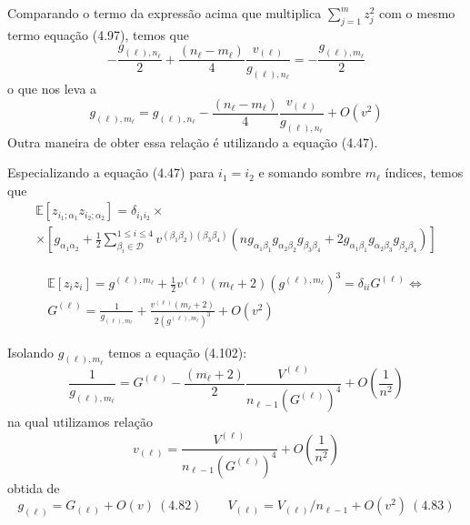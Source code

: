 \documentclass{beamer}
\newcommand{\EE}{\mathbb{E}}
\newcommand{\Dcal}{\mathcal{D}}
\def\mi#1{{\alpha_{#1}}}
\def\mj#1{\beta_{#1}}
\def\eell{{(\ell)}}
\newcommand{\zia}[2]{z_{i_{#1};\mi{#2}}}
\begin{document}
\begin{frame}
	Comparando o termo da expressão acima que multiplica $\sum_{j=1}^{m}z_j^2$ com o mesmo termo equação (4.97), temos que 
	\[
	-\frac{g_{\eell,n_\ell}}{2} + \frac{(n_\ell-m_\ell)}{4}\frac{v_\eell}{g_{\eell,n_\ell}} = -\frac{g_{\eell,m_\ell}}{2}
	\]
	o que nos leva a
	\begin{equation*}\tag{4.100}
		g_{\eell,m_\ell} = g_{\eell,n_\ell} - \frac{(n_\ell -m_\ell)}{4}\frac{v_{\eell}}{g_{\eell,n_\ell}} + O(v^2)
	\end{equation*}  
	Outra maneira de obter essa relação é utilizando a equação (4.47).
\end{frame}


\begin{frame}
	Especializando a equação (4.47) para $i_1=i_2$ e somando sombre $m_\ell$ índices, temos que
	\footnotesize
	\begin{multline*}\tag{4.47}
		\EE[\zia11\zia22] = \delta_{i_1 i_2}\times\\\times\left[g_{\mi1\mi2} + \frac{1}{2} \sum_{\mj{i}\in\Dcal}^{1\le{i}\le4} v^{(\mj1\mj2)(\mj3\mj4)}(ng_{\mi1\mj1}g_{\mi2\mj2}g_{\mj3\mj4} +2g_{\mi1\mj1}g_{\mi2\mj3}g_{\mj2\mj4})\right] 
	\end{multline*}
	 
	\begin{multline*}\tag{4.101}
		\EE[z_i z_i] = g^{\eell,m_\ell} + \frac{1}{2} v^\eell(m_\ell+2)(g^{\eell,m_\ell})^3  = \delta_{ii}G^\eell \Leftrightarrow\\%
		G^\eell = \frac{1}{g_{\eell,m_\ell}} + \frac{ v^\eell(m_\ell+2)}{2(g^{\eell,m_\ell})^3} + O\left(v^2\right)
	\end{multline*}
\end{frame}

\begin{frame}
	Isolando $g_{\eell,m_\ell}$ temos a equação (4.102):
	\begin{equation*}\tag{4.102}
		\frac{1}{g_{\eell,m_\ell}} = G^\eell - \frac{(m_\ell+2)}{2}\frac{V^\eell}{n_{\ell-1}(G^\eell)^4} + O\left(\frac{1}{n^2}\right)
	\end{equation*}
	na qual utilizamos relação
	\begin{equation*}\tag{4.103}
		v_\eell = \frac{V^\eell}{n_{\ell-1}(G^\eell)^4} + O\left(\frac{1}{n^2}\right)
	\end{equation*}
	obtida de 
	\footnotesize
	$$g_\eell = G_\eell + O(v) \ (4.82) \qquad V_\eell = V_\eell/n_{\ell-1} + O(v^2)\ (4.83)$$
\end{frame}
\end{document}
